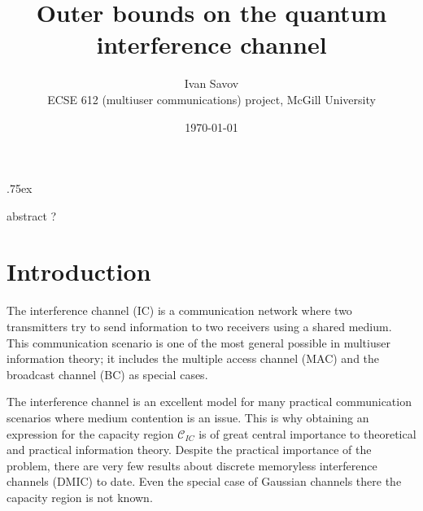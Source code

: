 \documentclass[aps,11pt,twoside,letterpaper]{article}
\newcommand{\ICcap}{  \ensuremath{\mathcal C}_{IC} }
\begin{document}
\title{{\Large Outer bounds on the quantum interference channel} }
\date{\today} 
\author{Ivan Savov \\
    ECSE 612 (multiuser communications) project, McGill University}




\parskip .75ex             %
\maketitle



abstract ?

\section{Introduction}


    The interference channel (IC) is a communication network where two transmitters try to send
    information to two receivers using a shared medium. 
    This communication scenario is one of the most general possible in multiuser information
    theory; it includes the multiple access channel (MAC) and the broadcast channel (BC)
    as special cases.
    
    The interference channel is an excellent model for many practical communication scenarios
    where medium contention is an issue. 
    This is why obtaining an expression for the capacity region $\ICcap$ 
    is of great central importance to theoretical and practical information theory.
    Despite the practical importance of the problem, there are very few results about 
    discrete memoryless interference channels (DMIC) to date.
    Even the special case of Gaussian channels there the capacity region is not known.
    
\end{document}
